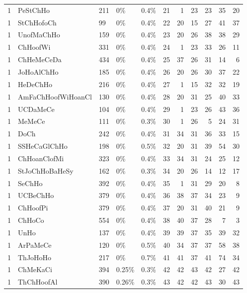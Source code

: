 \begin{longtable}{lllllrrrrrr}
  1 & PeStChHo & 211 & 0\% & 0.4\% &  21 &   1 &  23 &  23 &  35 &  20 \\ 
  1 & StChHofoCh & 99 & 0\% & 0.4\% &  22 &  20 &  15 &  27 &  41 &  37 \\ 
  1 & UnofMaChHo & 159 & 0\% & 0.4\% &  23 &  20 &  26 &  38 &  38 &  29 \\ 
  1 & ChHoofWi & 331 & 0\% & 0.4\% &  24 &   1 &  23 &  33 &  26 &  11 \\ 
  1 & ChHeMeCeDa & 434 & 0\% & 0.4\% &  25 &  37 &  26 &  31 &  14 &   6 \\ 
  1 & JoHoAlChHo & 185 & 0\% & 0.4\% &  26 &  20 &  26 &  30 &  37 &  22 \\ 
  1 & HeDeChHo & 216 & 0\% & 0.4\% &  27 &   1 &  15 &  32 &  32 &  19 \\ 
  1 & AmFaChHoofWiHoanCl & 130 & 0\% & 0.4\% &  28 &  20 &  31 &  25 &  40 &  33 \\ 
  1 & UCDaMeCe & 104 & 0\% & 0.4\% &  29 &   1 &  23 &  26 &  43 &  36 \\ 
  1 & MeMeCe & 111 & 0\% & 0.3\% &  30 &   1 &  26 &   5 &  24 &  31 \\ 
  1 & DoCh & 242 & 0\% & 0.4\% &  31 &  34 &  31 &  36 &  33 &  15 \\ 
  1 & SSHeCaGlChHo & 198 & 0\% & 0.5\% &  32 &  20 &  31 &  39 &  54 &  30 \\ 
  1 & ChHoanClofMi & 323 & 0\% & 0.4\% &  33 &  34 &  31 &  24 &  25 &  12 \\ 
  1 & StJoChHoBaHeSy & 162 & 0\% & 0.3\% &  34 &  20 &  26 &  14 &  12 &  17 \\ 
  1 & SeChHo & 392 & 0\% & 0.4\% &  35 &   1 &  31 &  29 &  20 &   8 \\ 
  1 & UCBeChHo & 379 & 0\% & 0.4\% &  36 &  38 &  37 &  34 &  23 &   9 \\ 
  1 & ChHoofPi & 379 & 0\% & 0.4\% &  37 &  20 &  31 &  40 &  21 &   9 \\ 
  1 & ChHoCo & 554 & 0\% & 0.4\% &  38 &  40 &  37 &  28 &   7 &   3 \\ 
  1 & UnHo & 137 & 0\% & 0.4\% &  39 &  39 &  37 &  35 &  39 &  32 \\ 
  1 & ArPaMeCe & 120 & 0\% & 0.5\% &  40 &  34 &  37 &  37 &  58 &  38 \\ 
  1 & ThJoHoHo & 217 & 0\% & 0.7\% &  41 &  41 &  37 &  41 &  74 &  34 \\ 
  1 & ChMeKaCi & 394 & 0.25\% & 0.3\% &  42 &  42 &  43 &  42 &  27 &  42 \\ 
  1 & ThChHoofAl & 390 & 0.26\% & 0.3\% &  43 &  42 &  42 &  43 &  30 &  43 \\ 

\end{longtable}
